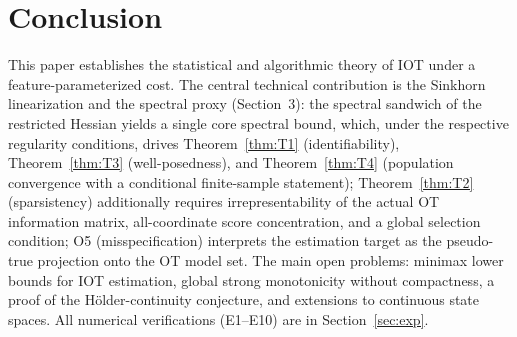 \documentclass[11pt,a4paper]{article}
\theoremstyle{remark}
\begin{document}
\section{Conclusion}\label{sec:conclusion}

This paper establishes the statistical and algorithmic theory of IOT under a
feature-parameterized cost. The central technical contribution is the Sinkhorn
linearization and the spectral proxy (Section~3): the spectral sandwich of the restricted
Hessian yields a single core spectral bound, which, under the respective regularity
conditions, drives Theorem~\ref{thm:T1} (identifiability), Theorem~\ref{thm:T3}
(well-posedness), and Theorem~\ref{thm:T4} (population convergence with a conditional
finite-sample statement); Theorem~\ref{thm:T2} (sparsistency) additionally requires
irrepresentability of the actual OT information matrix, all-coordinate score concentration,
and a global selection condition; O5 (misspecification) interprets the estimation target as
the pseudo-true projection onto the OT model set. The main open problems: minimax lower
bounds for IOT estimation, global strong monotonicity without compactness, a proof of the
H\"older-continuity conjecture, and extensions to continuous state spaces. All numerical
verifications (E1--E10) are in Section~\ref{sec:exp}.


\FloatBarrier


\end{document}
